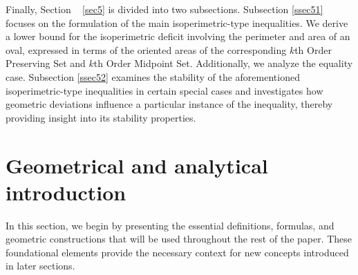 \documentclass{amsart}
\theoremstyle{definition}
\numberwithin{equation}{section}
\begin{document}
Finally, Section ~ \ref{sec5} is divided into two subsections. Subsection \ref{ssec51} focuses on the formulation of the main isoperimetric-type inequalities. We derive a lower bound for the isoperimetric deficit involving the perimeter and area of an oval, expressed in terms of the oriented areas of the corresponding $k$th Order Preserving Set and $k$th Order Midpoint Set.  Additionally, we analyze the equality case. Subsection \ref{ssec52} examines the stability of the aforementioned isoperimetric-type inequalities in certain special cases and investigates how geometric deviations influence a particular instance of the inequality, thereby providing insight into its stability properties.



\section{Geometrical and analytical introduction}\label{sec2}

\noindent In this section, we begin by presenting the essential definitions, formulas, and geometric constructions that will be used throughout the rest of the paper. These foundational elements provide the necessary context for new concepts introduced in later sections.
\end{document}
